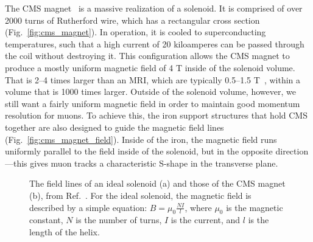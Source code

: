 The CMS magnet~\cite{CERN-LHCC-97-010} is a massive realization of a solenoid. 
It is comprised of over 2000 turns of Rutherford wire, which has a rectangular cross section (Fig.~\ref{fig:cms_magnet}). 
In operation, it is cooled to superconducting temperatures, such that a high current of 20 kiloamperes\footnotemark{} can be passed through the coil without destroying it. 
This configuration allows the CMS magnet to produce a mostly uniform magnetic field of 4 T inside of the solenoid volume. 
That is 2--4 times larger than an MRI, which are typically 0.5--1.5 T~\cite{Berger2002-gs}, within a volume that is 1000 times larger. %
Outside of the solenoid volume, however, we still want a fairly uniform magnetic field in order to maintain good momentum resolution for muons. 
To achieve this, the iron support structures that hold CMS together are also designed to guide the magnetic field lines (Fig.~\ref{fig:cms_magnet_field}). 
Inside of the iron, the magnetic field runs uniformly parallel to the field inside of the solenoid, but in the opposite direction---this gives muon tracks a characteristic S-shape in the transverse plane. 

\begin{figure}[htb]
    \centering
    \quad
    \caption{
        The field lines of an ideal solenoid (a) and those of the CMS magnet (b), from Ref.~\cite{CMS:2009moq}. 
        For the ideal solenoid, the magnetic field is described by a simple equation: $B = \mu_0\frac{NI}{l}$, where $\mu_0$ is the magnetic constant, $N$ is the number of turns, $I$ is the current, and $l$ is the length of the helix. 
    }
    \label{fig:cms_fields}
\end{figure}


